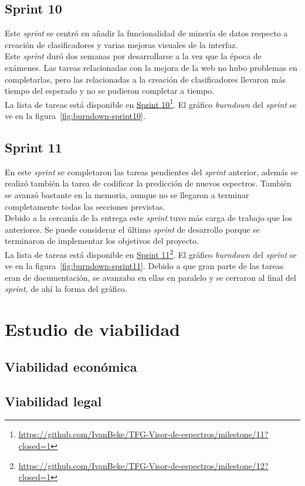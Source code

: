 
\subsection{Sprint 10}
Este \textit{sprint} se centró en añadir la funcionalidad de minería de datos
respecto a creación de clasificadores y varias mejoras visuales de la
interfaz.\\

Este \textit{sprint} duró dos semanas por desarrollarse a la vez que la época de
exámenes. Las tareas relacionadas con la mejora de la web no hubo problemas en
completarlas, pero las relacionadas a la creación de clasificadores llevaron más
tiempo del esperado y no se pudieron completar a tiempo.\\

La lista de tareas está disponible en
\href{https://github.com/IvanBeke/TFG-Visor-de-espectros/milestone/11?closed=1}{Sprint
	10}\footnote{\url{https://github.com/IvanBeke/TFG-Visor-de-espectros/milestone/11?closed=1}}.
El gráfico \textit{burndown} del \textit{sprint} se ve en la
figura~\ref{fig:burndown-sprint10}.\\


\subsection{Sprint 11}
En este \textit{sprint} se completaron las tareas pendientes del \textit{sprint}
anterior, además se realizó también la tarea de codificar la predicción de 
nuevos espectros. También se avanzó bastante en la memoria, aunque no se 
llegaron a terminar completamente todas las secciones previstas.\\

Debido a la cercanía de la entrega este \textit{sprint} tuvo más carga de
trabajo que los anteriores. Se puede considerar el último \textit{sprint} de
desarrollo porque se terminaron de implementar los objetivos del proyecto.\\

La lista de tareas está disponible en
\href{https://github.com/IvanBeke/TFG-Visor-de-espectros/milestone/12?closed=1}{Sprint	
	11}\footnote{\url{https://github.com/IvanBeke/TFG-Visor-de-espectros/milestone/12?closed=1}}.
El gráfico \textit{burndown} del \textit{sprint} se ve en la
figura~\ref{fig:burndown-sprint11}. Debido a que gran parte de las tareas eran
de documentación, se avanzaba en ellas en paralelo y se cerraron al final del
\textit{sprint}, de ahí la forma del gráfico.\\


\section{Estudio de viabilidad}

\subsection{Viabilidad económica}

\subsection{Viabilidad legal}
